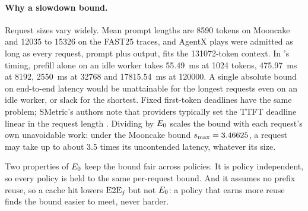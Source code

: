 \paragraph{Why a slowdown bound.}
Request sizes vary widely. Mean prompt lengths are \num{8590} tokens on Mooncake
and \num{12035} to \num{15326} on the FAST25 traces, and AgentX plays were admitted as long as
every request, prompt plus output, fits the \num{131072}-token context. In \ais{}'s timing, prefill
alone on an idle worker takes \SI{55.49}{ms} at \num{1024} tokens, \SI{475.97}{ms} at \num{8192},
\SI{2550}{ms} at \num{32768} and \SI{17815.54}{ms} at \num{120000}. A single absolute bound on
end-to-end latency would be unattainable for the longest requests even on an idle worker, or slack
for the shortest. Fixed first-token deadlines have the same problem; SMetric's authors note that
providers typically set the TTFT deadline linear in the request length \citep{wang2026smetric}. Dividing by $E_0$ scales the bound
with each request's own unavoidable work: under the Mooncake bound $s_{\max} = 3.46625$, a request may
take up to about 3.5 times its uncontended latency, whatever its size.

Two properties of $E_0$ keep the bound fair across policies. It is policy independent, so every
policy is held to the same per-request bound. And it assumes no prefix reuse, so a cache hit lowers
$\mathrm{E2E}_j$ but not $E_0$: a policy that earns more reuse finds the bound easier to meet, never
harder.


